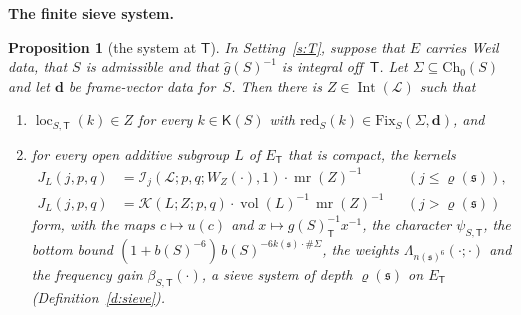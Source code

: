 \documentclass[11pt,a4paper]{article}
\newcommand{\m}[1]{\mbox{$#1$}}        %
\newcommand{\subhead}[1]{\par\addvspace{9pt plus 2pt}\Needspace{4\baselineskip}\noindent\textbf{#1}\enspace\ignorespaces}
\theoremstyle{plainx}
\newtheorem{proposition}[theorem]{Proposition}
\theoremstyle{uprightx}
\newcommand{\fs}{\mathfrak{s}}                      %
\newcommand{\sT}{\mathsf{T}}                        %
\newcommand{\cL}{\mathcal{L}}                       %
\newcommand{\rh}[1]{\varrho(#1)}                    %
\newcommand{\kk}[1]{k(#1)}                          %
\newcommand{\nn}[1]{n(#1)}                          %
\newcommand{\ET}[1]{E_{#1}}                         %
\newcommand{\bS}[1]{b(#1)}                          %
\newcommand{\gS}[1]{g(#1)}                          %
\newcommand{\ChS}[2]{\mathrm{Ch}_{#2}(#1)}          %
\newcommand{\KS}[1]{\mathsf{K}(#1)}                          %
\newcommand{\redS}[1]{\mathrm{red}_{#1}}            %
\newcommand{\gid}[1]{\hat{g}(#1)}                   %
\newcommand{\fixset}[3]{\mathrm{Fix}_{#1}(#2,#3)}   %
\newcommand{\charT}[2]{\psi_{#1,#2}}                %
\newcommand{\fgain}[3]{\beta_{#1,#2}(#3)}           %
\newcommand{\IntG}[1]{\operatorname{Int}(#1)}       %
\newcommand{\mr}[1]{\operatorname{mr}(#1)}          %
\newcommand{\bvec}[2]{W_{#1}(#2)}                   %
\newcommand{\topK}[4]{\mathcal{K}(#1;#2;#3,#4)}     %
\newcommand{\loc}[2]{\operatorname{loc}_{#1,#2}}    %
\newcommand{\fform}[6]{\mathcal{I}_{#2}(#1;#3,#4;#5,#6)} %
\newcommand{\fhw}[3]{\Lambda_{#1}(#2;#3)}           %
\newcommand{\vol}{\operatorname{vol}}
\begin{document}
\subhead{The finite sieve system.}
\begin{proposition}[the system at $\sT$]\label{p:sieve}
In Setting~\ref{s:T}, suppose that $E$ carries Weil data, that $S$ is admissible and that \m{\gid{S}^{-1}} is
integral off~$\sT$. Let \m{\Sigma\subseteq\ChS{S}{0}} and let $\mathbf d$ be frame-vector data for~$S$. Then
there is \m{Z\in\IntG{\cL}} such that
\begin{enumerate}[label=\textup{(\roman*)},leftmargin=2.3em,itemsep=1pt]
\item \m{\loc{S}{\sT}(k)\in Z} for every \m{k\in\KS{S}} with \m{\redS{S}(k)\in\fixset{S}{\Sigma}{\mathbf d}}, and
\item for every open additive subgroup $L$ of \m{\ET{\sT}} that is compact, the kernels
\[\begin{aligned}J_L(j,p,q)&=\fform{\cL}{j}{p}{q}{\bvec{Z}{\cdot}}{1}\cdot\mr{Z}^{-1}&&(j\le\rh{\fs}),\\
J_L(j,p,q)&=\topK{L}{Z}{p}{q}\cdot\vol(L)^{-1}\,\mr{Z}^{-1}&&(j>\rh{\fs})\end{aligned}\]
form, with the maps \m{c\mapsto u(c)} and \m{x\mapsto\gS{S}_{\sT}^{-1}x^{-1}}, the character
\m{\charT{S}{\sT}}, the bottom bound \m{(1+\bS{S}^{-6})\,\bS{S}^{-6\kk{\fs}\cdot\#\Sigma}}, the weights
\m{\fhw{\nn{\fs}^6}{\cdot}{\cdot}} and the frequency gain \m{\fgain{S}{\sT}{\cdot}}, a sieve system of depth
\m{\rh{\fs}} on \m{\ET{\sT}} (Definition~\ref{d:sieve}).
\end{enumerate}
\end{proposition}
\end{document}
